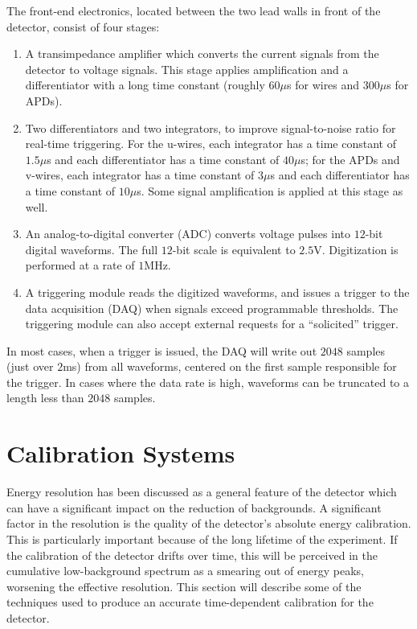 The front-end electronics, located between the two lead walls in front of the detector, consist of four stages:~\cite{detectorPartI}~\cite{ReconstructionDocument}
\begin{enumerate}
\item A transimpedance amplifier which converts the current signals from the detector to voltage signals.  This stage applies amplification and a differentiator with a long time constant (roughly $60\mu$s for wires and $300\mu$s for APDs).
\item Two differentiators and two integrators, to improve signal-to-noise ratio for real-time triggering.  For the u-wires, each integrator has a time constant of $1.5\mu$s and each differentiator has a time constant of $40\mu$s; for the APDs and v-wires, each integrator has a time constant of $3\mu$s and each differentiator has a time constant of $10\mu$s.  Some signal amplification is applied at this stage as well.
\item An analog-to-digital converter (ADC) converts voltage pulses into $12$-bit digital waveforms.  The full $12$-bit scale is equivalent to $2.5$V.  Digitization is performed at a rate of $1$MHz.
\item A triggering module reads the digitized waveforms, and issues a trigger to the data acquisition (DAQ) when signals exceed programmable thresholds.  The triggering module can also accept external requests for a ``solicited'' trigger.
\end{enumerate}
In most cases, when a trigger is issued, the DAQ will write out $2048$ samples (just over $2$ms) from all waveforms, centered on the first sample responsible for the trigger.  In cases where the data rate is high, waveforms can be truncated to a length less than $2048$ samples.

\section{Calibration Systems}\label{sec:DetectorCalibration}

Energy resolution has been discussed as a general feature of the detector which can have a significant impact on the reduction of backgrounds.   A significant factor in the resolution is the quality of the detector's absolute energy calibration.  This is particularly important because of the long lifetime of the experiment.  If the calibration of the detector drifts over time, this will be perceived in the cumulative low-background spectrum as a smearing out of energy peaks, worsening the effective resolution.  This section will describe some of the techniques used to produce an accurate time-dependent calibration for the detector.

